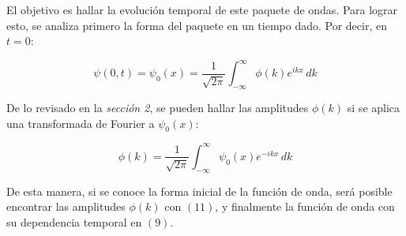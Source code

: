 El objetivo es hallar la evolución temporal de este paquete de ondas. Para lograr esto, se analiza primero la forma del 
paquete en un tiempo dado. Por decir, en $t=0$:

\begin{equation}
    \psi(0,t) = \psi_{0}(x) = \frac{1}{\sqrt{2\pi}} \int_{-\infty}^{\infty} \phi(k)e^{ikx}\,dk
\end{equation}

De lo revisado en la \emph{sección 2}, se pueden hallar las amplitudes $\phi(k)$ si se aplica una transformada de Fourier
a $\psi_{0}(x)$:

\begin{equation}
    \phi(k) = \frac{1}{\sqrt{2\pi}} \int_{-\infty}^{\infty} \psi_{0}(x)e^{-ikx}\,dk
\end{equation}

De esta manera, si se conoce la forma inicial de la función de onda, será posible encontrar las amplitudes $\phi(k)$ con
$(11)$, y finalmente la función de onda con su dependencia temporal en $(9)$.